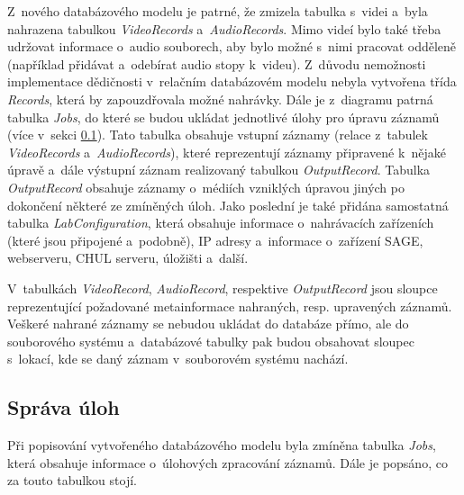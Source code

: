 \documentclass[thesis=M,czech]{FITthesis}[2012/06/26]
\begin{document}
Z~nového databázového modelu je patrné, že zmizela tabulka s~videi a~byla nahrazena tabulkou \textit{VideoRecords} a~\textit{AudioRecords}. Mimo videí bylo také třeba udržovat informace o~audio souborech, aby bylo možné s~nimi pracovat odděleně (například přidávat a~odebírat audio stopy k~videu). Z~důvodu nemožnosti implementace dědičnosti v~relačním databázovém modelu nebyla vytvořena třída \textit{Records}, která by zapouzdřovala možné nahrávky. Dále je z~diagramu patrná tabulka \textit{Jobs},  do které se budou ukládat jednotlivé úlohy pro úpravu záznamů (více v~sekci \ref{subsec:navrh_backend_ulohy}). Tato tabulka obsahuje vstupní záznamy (relace z~tabulek \textit{VideoRecords} a~\textit{AudioRecords}), které reprezentují záznamy připravené k~nějaké úpravě a~dále výstupní záznam realizovaný tabulkou \textit{OutputRecord}. Tabulka \textit{OutputRecord} obsahuje záznamy o~médiích vzniklých úpravou jiných po dokončení některé ze zmíněných úloh. Jako poslední je také přidána samostatná tabulka \textit{LabConfiguration}, která obsahuje informace o~nahrávacích zařízeních (které jsou připojené a~podobně), IP adresy a~informace o~zařízení SAGE, webserveru, CHUL serveru, úložišti a~další.

V~tabulkách \textit{VideoRecord}, \textit{AudioRecord}, respektive \textit{OutputRecord} jsou sloupce reprezentující požadované metainformace nahraných, resp. upravených záznamů. Veškeré nahrané záznamy se nebudou ukládat do databáze přímo, ale do souborového systému a~databázové tabulky pak budou obsahovat sloupec s~lokací, kde se daný záznam v~souborovém systému nachází.


\subsection{Správa úloh} \label{subsec:navrh_backend_ulohy}
Při popisování vytvořeného databázového modelu byla zmíněna tabulka \textit{Jobs}, která obsahuje informace o~úlohových zpracování záznamů. Dále je popsáno, co za touto tabulkou stojí.
\end{document}
